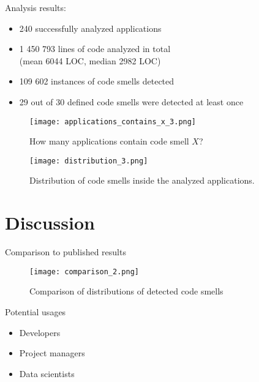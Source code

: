 \documentclass{beamer}
\begin{document}
    \begin{frame}{\secname}
        Analysis results:
        \begin{itemize}
            \item 240 successfully analyzed applications
            \item 1 450 793 lines of code analyzed in total \\ (mean 6044 LOC, median 2982 LOC)
            \item 109 602 instances of code smells detected
            \item 29 out of 30 defined code smells were detected at least once
        \end{itemize}
    \end{frame}

    \begin{frame}{\secname}
        \begin{figure}
            \centering
            \texttt{[image: applications\_contains\_x\_3.png]}
            \caption{How many applications contain code smell $X$?}
            \label{fig:my_label}
        \end{figure}
    \end{frame}

    \begin{frame}{\secname}
        \begin{figure}
            \centering
            \texttt{[image: distribution\_3.png]}
            \caption{Distribution of code smells inside the analyzed applications.}
            \label{fig:my_label}
        \end{figure}
    \end{frame}

    \section{Discussion}\label{sec:discussion}
    \begin{frame}{Comparison to published results}
        \begin{figure}
            \centering
            \texttt{[image: comparison\_2.png]}
            \caption{Comparison of distributions of detected code smells}
            \label{fig:my_label}
        \end{figure}
    \end{frame}

    \begin{frame}{Potential usages}
        \begin{itemize}
            \item Developers
            \item Project managers
            \item Data scientists
        \end{itemize}
    \end{frame}
\end{document}
